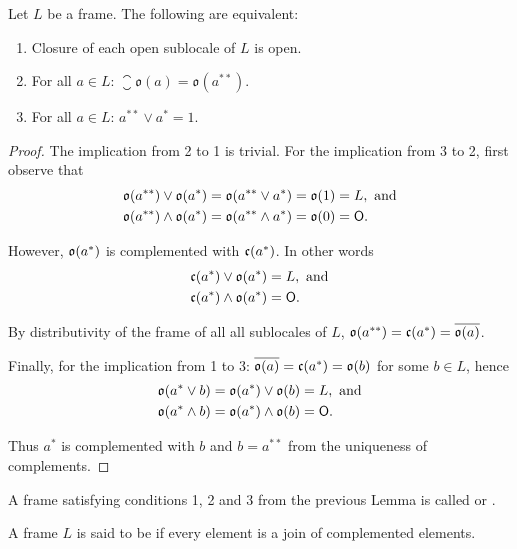 \begin{lemma}
    Let $L$ be a frame. The following are equivalent:

    \begin{enumerate}
        \item Closure of each open sublocale of $L$ is open.
        \item For all $a \in L$: $\closure{\mathfrak{o}(a)} = \mathfrak{o}(a^{**})$.
        \item For all $a \in L$: $a^{**} \vee a^* = 1$.
    \end{enumerate}
\end{lemma}
\begin{proof}
    The implication from 2 to 1 is trivial. For the implication from 3 to 2, first observe that
    \begin{align*}
        \mathfrak{o}(a^{**})\vee \mathfrak{o}(a^*) &= \mathfrak{o}(a^{**}\vee a^*) = \mathfrak{o}(1) = L, \text{ and} \\
        \mathfrak{o}(a^{**})\wedge \mathfrak{o}(a^*) &= \mathfrak{o}(a^{**}\wedge a^*) = \mathfrak{o}(0) = \mathsf{O}.
    \end{align*}

    \noindent However, $\mathfrak{o}(a^*)$ is complemented with $\mathfrak{c}(a^*)$. In other words
    \begin{align*}
        \mathfrak{c}(a^*)\vee \mathfrak{o}(a^*) &= L, \text{ and} \\
        \mathfrak{c}(a^*)\wedge \mathfrak{o}(a^*) &= \mathsf{O}.
    \end{align*}

    \noindent By distributivity of the frame of all all sublocales of $L$, $\mathfrak{o}(a^{**}) = \mathfrak{c}(a^*) = \overline{\mathfrak{o}(a)}$.

    Finally, for the implication from 1 to 3: $\overline{\mathfrak{o}(a)} = \mathfrak{c}(a^*) = \mathfrak{o}(b)$ for some $b \in L$, hence
    \begin{align*}
        \mathfrak{o}(a^*\vee b) &= \mathfrak{o}(a^*)\vee   \mathfrak{o}(b) = L, \text{ and} \\
        \mathfrak{o}(a^*\wedge b) &= \mathfrak{o}(a^*)\wedge \mathfrak{o}(b) = \mathsf{O}.
    \end{align*}

    \noindent Thus $a^*$ is complemented with $b$ and $b = a^{**}$ from the uniqueness of complements.
\end{proof}

\begin{definition}
    A frame satisfying conditions 1, 2 and 3 from the previous Lemma is called  or .

    \vspace{0.8em}
    A frame $L$ is said to be  if every element is a join of complemented elements.
\end{definition}

